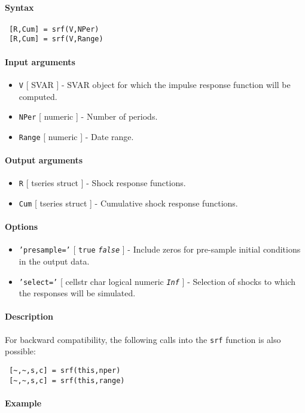 


	\paragraph{Syntax}
 
 \begin{verbatim}
 [R,Cum] = srf(V,NPer)
 [R,Cum] = srf(V,Range)
 \end{verbatim}
 
 \paragraph{Input arguments}
 
 \begin{itemize}
 \item
   \texttt{V} {[} SVAR {]} - SVAR object for which the impulse response
   function will be computed.
 \item
   \texttt{NPer} {[} numeric {]} - Number of periods.
 \item
   \texttt{Range} {[} numeric {]} - Date range.
 \end{itemize}
 
 \paragraph{Output arguments}
 
 \begin{itemize}
 \item
   \texttt{R} {[} tseries \textbar{} struct {]} - Shock response
   functions.
 \item
   \texttt{Cum} {[} tseries \textbar{} struct {]} - Cumulative shock
   response functions.
 \end{itemize}
 
 \paragraph{Options}
 
 \begin{itemize}
 \item
   \texttt{'presample='} {[} \texttt{true} \textbar{}
   \emph{\texttt{false}} {]} - Include zeros for pre-sample initial
   conditions in the output data.
 \item
   \texttt{'select='} {[} cellstr \textbar{} char \textbar{} logical
   \textbar{} numeric \textbar{} \emph{\texttt{Inf}} {]} - Selection of
   shocks to which the responses will be simulated.
 \end{itemize}
 
 \paragraph{Description}
 
 For backward compatibility, the following calls into the \texttt{srf}
 function is also possible:
 
 \begin{verbatim}
 [~,~,s,c] = srf(this,nper)
 [~,~,s,c] = srf(this,range)
 \end{verbatim}
 
 \paragraph{Example}


